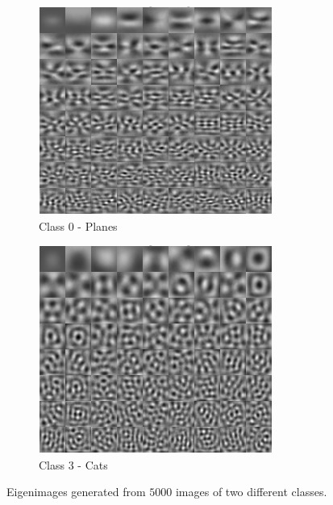 \documentclass{article} %
\begin{document}
\begin{figure}[h]
\centering
\begin{subfigure}{.5\textwidth}
  \centering
  \includegraphics[width=.9\linewidth]{CIFAR10C05000Eigenimages}
  \caption{Class 0 - Planes}
  \label{fig:eigenImagesC0}
\end{subfigure}%
\begin{subfigure}{.5\textwidth}
  \centering
  \includegraphics[width=.9\linewidth]{CIFAR10C35000Eigenimages}
  \caption{Class 3 - Cats}
  \label{fig:eigenImagesC3}
\end{subfigure}
\caption{Eigenimages generated from $5000$ images of two different classes.}
\label{fig:eigenImagesC0C3}
\end{figure}
\end{document}
